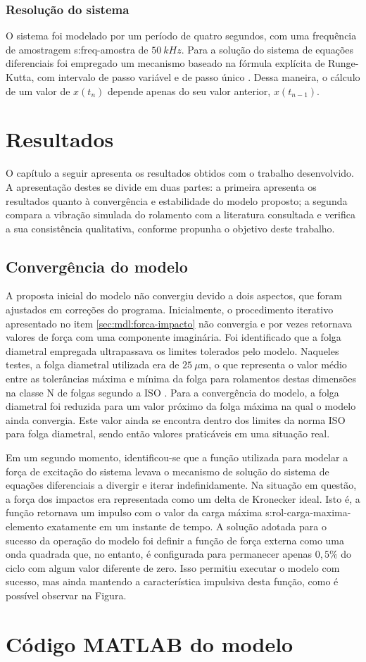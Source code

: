\documentclass[12pt,oneside,english,brazil,lmodern,siglas,simbolos,cite=num]{ucsmonograph}
\begin{document}
	\subsection{Resolução do sistema}
	O sistema foi modelado por um período de quatro segundos, com uma frequência de amostragem \gls{s:freq-amostra} de $50\ kHz$. 
	Para a solução do sistema de equações diferenciais foi empregado um mecanismo baseado na fórmula explícita de Runge-Kutta, com intervalo de passo variável e de passo único \cite{ode45}.
	Dessa maneira, o cálculo de um valor de $x(t_n)$ depende apenas do seu valor anterior, $x(t_{n-1})$.
	
	\chapter{Resultados}
	O capítulo a seguir apresenta os resultados obtidos com o trabalho desenvolvido.
	A apresentação destes se divide em duas partes: a primeira apresenta os resultados quanto à convergência e estabilidade do modelo proposto;
	a segunda compara a vibração simulada do rolamento com a literatura consultada e verifica a sua consistência qualitativa, conforme propunha o objetivo deste trabalho.
	
	\section{Convergência do modelo}
	A proposta inicial do modelo não convergiu devido a dois aspectos, que foram ajustados em correções do programa.
	Inicialmente, o procedimento iterativo apresentado no item \ref{sec:mdl:forca-impacto} não convergia e por vezes retornava valores de força com uma componente imaginária.
	Foi identificado que a folga diametral empregada ultrapassava os limites tolerados pelo modelo.
	Naqueles testes, a folga diametral utilizada era de $25\ \mu\text{m}$, o que representa o valor médio entre as tolerâncias máxima e mínima da folga para rolamentos destas dimensões na classe N de folgas segundo a ISO \cite{skf6004}.
	Para a convergência do modelo, a folga diametral foi reduzida para um valor próximo da folga máxima na qual o modelo ainda convergia.
	Este valor ainda se encontra dentro dos limites da norma ISO para folga diametral, sendo então valores praticáveis em uma situação real.
	
	Em um segundo momento, identificou-se que a função utilizada para modelar a força de excitação do sistema levava o mecanismo de solução do sistema de equações diferenciais a divergir e iterar indefinidamente.
	Na situação em questão, a força dos impactos era representada como um delta de Kronecker ideal.
	Isto é, a função retornava um impulso com o valor da carga máxima \gls{s:rol-carga-maxima-elemento} exatamente em um instante de tempo.
	A solução adotada para o sucesso da operação do modelo foi definir a função de força externa como uma onda quadrada que, no entanto, é configurada para permanecer apenas $0,5\%$ do ciclo com algum valor diferente de zero.
	Isso permitiu executar o modelo com sucesso, mas ainda mantendo a característica impulsiva desta função, como é possível observar na Figura.
	
	\postextual
	
	
	
	\apendices
	\chapter{Código MATLAB do modelo} \label{apc:codigo}
	
	
\end{document}
